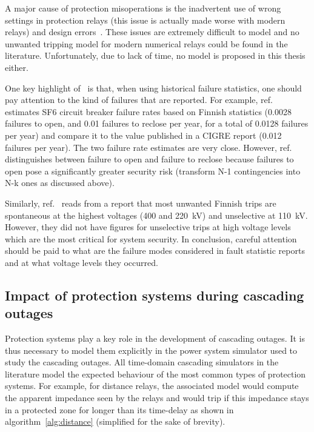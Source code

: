 A major cause of protection misoperations is the inadvertent use of wrong settings in protection relays (this issue is actually made worse with modern relays) and design errors~\cite{ProtectionMisoperationsBian2012}. These issues are extremely difficult to model and no unwanted tripping model for modern numerical relays could be found in the literature. Unfortunately, due to lack of time, no model is proposed in this thesis either.

\begin{tcolorbox}[width=\linewidth, %
    colback=red!5!white,
    colframe=red!75!black,
    breakable,
    float, floatplacement=h,
    title=Note]
One key highlight of~\cite{GridPSA} is that, when using historical failure statistics, one should pay attention to the kind of failures that are reported. For example, ref.~\cite{GridPSA} estimates SF6 circuit breaker failure rates based on Finnish statistics (0.0028 failures to open, and 0.01 failures to reclose per year, for a total of 0.0128 failures per year) and compare it to the value published in a CIGRE report (0.012 failures per year). The two failure rate estimates are very close. However, ref.~\cite{GridPSA} distinguishes between failure to open and failure to reclose because failures to open pose a significantly greater security risk (transform N-1 contingencies into N-k ones as discussed above).

Similarly, ref.~\cite{GridPSA} reads from a report that most unwanted Finnish trips are spontaneous at the highest voltages (400 and 220~kV) and unselective at 110~kV. However, they did not have figures for unselective trips at high voltage levels which are the most critical for system security. In conclusion, careful attention should be paid to what are the failure modes considered in fault statistic reports and at what voltage levels they occurred.
\end{tcolorbox}



\subsection{Impact of protection systems during cascading outages}
\label{sec:protection_cascade}

Protection systems play a key role in the development of cascading outages. It is thus necessary to model them explicitly in the power system simulator used to study the cascading outages. All time-domain cascading simulators in the literature model the expected behaviour of the most common types of protection systems. For example, for distance relays, the associated model would compute the apparent impedance seen by the relays and would trip if this impedance stays in a protected zone for longer than its time-delay as shown in algorithm~\ref{alg:distance} (simplified for the sake of brevity). %

